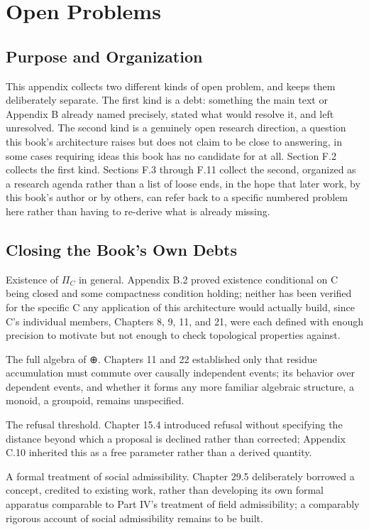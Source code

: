\chapter{Open Problems}

\section{Purpose and Organization}

This appendix collects two different kinds of open problem, and keeps them deliberately separate. The first kind is a debt: something the main text or Appendix B already named precisely, stated what would resolve it, and left unresolved. The second kind is a genuinely open research direction, a question this book's architecture raises but does not claim to be close to answering, in some cases requiring ideas this book has no candidate for at all. Section F.2 collects the first kind. Sections F.3 through F.11 collect the second, organized as a research agenda rather than a list of loose ends, in the hope that later work, by this book's author or by others, can refer back to a specific numbered problem here rather than having to re-derive what is already missing.

\section{Closing the Book's Own Debts}

Existence of \(\Pi_C\) in general. Appendix B.2 proved existence conditional on C being closed and some compactness condition holding; neither has been verified for the specific C any application of this architecture would actually build, since C's individual members, Chapters 8, 9, 11, and 21, were each defined with enough precision to motivate but not enough to check topological properties against.

The full algebra of ⊕. Chapters 11 and 22 established only that residue accumulation must commute over causally independent events; its behavior over dependent events, and whether it forms any more familiar algebraic structure, a monoid, a groupoid, remains unspecified.

The refusal threshold. Chapter 15.4 introduced refusal without specifying the distance beyond which a proposal is declined rather than corrected; Appendix C.10 inherited this as a free parameter rather than a derived quantity.

A formal treatment of social admissibility. Chapter 29.5 deliberately borrowed a concept, credited to existing work, rather than developing its own formal apparatus comparable to Part IV's treatment of field admissibility; a comparably rigorous account of social admissibility remains to be built.

